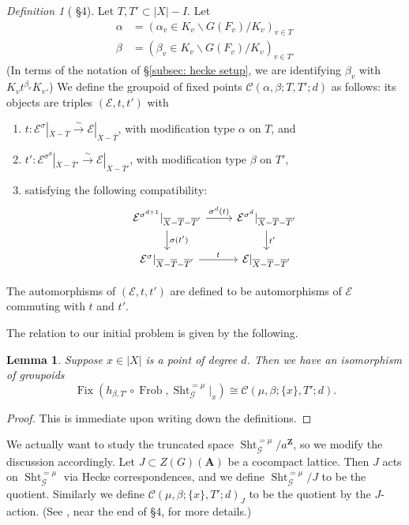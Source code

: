 \documentclass[reqno]{amsart}
\numberwithin{equation}{section}
\newcommand{\Z}{\mathbf{Z}}
\newcommand{\ol}[1]{\overline{#1}}
\newcommand{\Cal}[1]{\mathcal{#1}}
\newcommand{\A}{\mathbf{A}}
\newcommand{\co}{\colon}
\DeclareMathOperator{\Frob}{Frob}
\DeclareMathOperator{\Fix}{Fix}
\DeclareMathOperator{\Sht}{Sht}
\newtheorem{lemma}[thm]{Lemma}
\theoremstyle{remark}
\newtheorem{defn}[thm]{Definition}
\numberwithin{equation}{section}
\begin{document}
\begin{defn}[\cite{NgoNgo} \S 4]
Let $T, T' \subset |X| - I $. Let 
\begin{align*}
\alpha &= (\alpha_v  \in K_v \backslash G(F_v)  / K_v )_{v \in T}  \\
\beta &= (\beta_v  \in K_v \backslash G(F_v) /  K_v)_{v \in T'}
\end{align*}
(In terms of the notation of \S \ref{subsec: hecke setup}, we are identifying $\beta_v$ with $K_v t^{\beta_v} K_v$.) We define the groupoid of fixed points $\Cal{C}(\alpha,\beta; T,T'; d)$ as follows: its objects are triples $(\Cal{E}, t, t')$ with 
\begin{enumerate}
\item $t \co \Cal{E}^{\sigma} |_{\ol{X}-\ol{T}} \xrightarrow{\sim} \Cal{E} |_{\ol{X}-\ol{T}}$, with modification type $\alpha$ on $T$, and 
\item $t' \co \Cal{E}^{\sigma^d} |_{\ol{X}-\ol{T}'} \xrightarrow{\sim} \Cal{E} |_{\ol{X}-\ol{T}'}$, with modification type $\beta$ on $T'$,
\item satisfying the following compatibility:
\[
\begin{tikzcd}
\Cal{E}^{\sigma^{d+1}}  |_{\ol{X}-\ol{T} - \ol{T}'}\ar[r, "\sigma^d(t)"] \ar[d, "\sigma(t')"] &  \Cal{E}^{\sigma^d}|_{\ol{X}-\ol{T} - \ol{T}'} \ar[d, "t'"] \\
\Cal{E}^{\sigma}|_{\ol{X}-\ol{T} - \ol{T}'} \ar[r, "t"] &\Cal{E} |_{\ol{X}-\ol{T} - \ol{T}'}
\end{tikzcd}
\]
\end{enumerate}
The automorphisms of $(\Cal{E}, t, t')$ are defined to be automorphisms of $\Cal{E}$ commuting with $t$ and $t'$. 
\end{defn}

The relation to our initial problem is given by the following. 

\begin{lemma}
Suppose $x \in |X|$ is a point of degree $d$. Then we have an isomorphism of groupoids 
\[
\Fix(h_{\beta,T'} \circ \Frob, \Sht_{\Cal{G}}^{= \mu}|_x) \cong \Cal{C}(\mu, \beta; \{x\}, T';d).
\]
\end{lemma}

\begin{proof}
This is immediate upon writing down the definitions. 
\end{proof}

We actually want to study the truncated space $\Sht_{\Cal{G}}^{= \mu}/a^{\Z}$, so we modify the discussion accordingly. Let $J \subset Z(G)(\A)$ be a cocompact lattice. Then $J$ acts on $\Sht_{\Cal{G}}^{= \mu}$ via Hecke correspondences, and we define $\Sht_{\Cal{G}}^{= \mu}/J$ to be the quotient. Similarly we define $\Cal{C}(\mu, \beta; \{x\}, T';d)_J$ to be the quotient by the $J$-action. (See \cite{NgoNgo}, near the end of \S 4, for more details.) 
\end{document}
